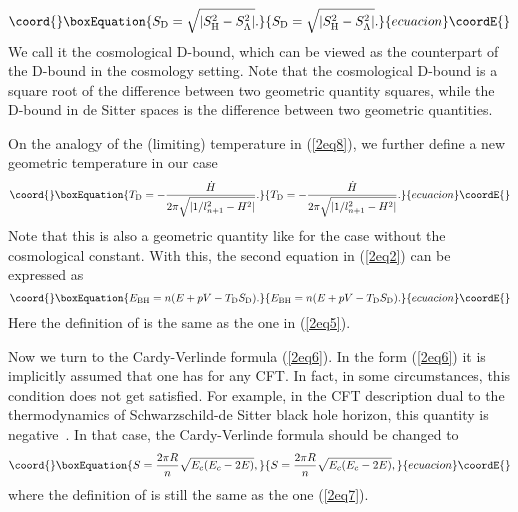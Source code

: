 \documentclass[a4paper,12pt]{article}
\begin{document}
\begin{equation}\coord{}\boxEquation{
\label{2eq13}
 S_{\rm D}=\sqrt{|S_{\rm H}^2-S_{\rm
 \Lambda}^2|}.
}{
S_{\rm D}=\sqrt{|S_{\rm H}^2-S_{\rm
 \Lambda}^2|}.
}{ecuacion}\coordE{}\end{equation}
We call it the cosmological D-bound, which can be viewed as the
counterpart of the D-bound in the cosmology setting. Note that the cosmological 
D-bound is a square root of the difference between two geometric quantity 
squares, while  the D-bound in de Sitter spaces is the difference between two geometric
quantities. 

   

On the analogy of the (limiting) temperature \coordHE{} in (\ref{2eq8}),
we  further  define a new geometric temperature in  our case
\begin{equation}\coord{}\boxEquation{
\label{2eq14}
 T_{\rm D}= -\frac{\dot H}{2\pi
  \sqrt{|1/l_{n+1}^2-H^2|}}.
}{
T_{\rm D}= -\frac{\dot H}{2\pi
  \sqrt{|1/l_{n+1}^2-H^2|}}.
}{ecuacion}\coordE{}\end{equation}
Note that this is also a geometric quantity like \coordHE{} for the case without 
the cosmological constant.  With this,  the second equation 
in (\ref{2eq2}) can be expressed as
\begin{equation}\coord{}\boxEquation{
\label{2eq15}
 E_{\rm BH}=n(E +pV -T_{\rm D}S_{\rm D}).
}{
E_{\rm BH}=n(E +pV -T_{\rm D}S_{\rm D}).
}{ecuacion}\coordE{}\end{equation}
Here the definition of \coordHE{} is the same as the one in
(\ref{2eq5}).

Now we turn to the Cardy-Verlinde formula (\ref{2eq6}). In the
form (\ref{2eq6}) it is implicitly assumed that one has \coordHE{} for any CFT. In fact, in some circumstances, this condition
does not get satisfied. For example, in the CFT description dual
to the thermodynamics of Schwarzschild-de Sitter black hole
horizon, this quantity is negative~\cite{Cai2}. In that case,
the Cardy-Verlinde formula should be changed to
\begin{equation}\coord{}\boxEquation{
\label{2eq16} S=\frac{2\pi R}{n}\sqrt{E_c(E_c-2E)},
}{
S=\frac{2\pi R}{n}\sqrt{E_c(E_c-2E)},
}{ecuacion}\coordE{}\end{equation}
where the definition of \coordHE{} is still the same as the one
(\ref{2eq7}).
\end{document}
